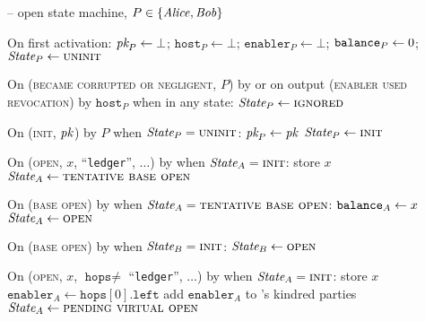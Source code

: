 \begin{center}
  \begin{systembox}{\fchan{} -- open state machine, $P \in \{\mathit{Alice}, \mathit{Bob}\}$}
    \begin{algorithmic}[1]
      \State On first activation: 
      \label{code:functionality:open:boot}
      \Indent
        \State $\textit{pk}_{P} \gets \bot$; $\texttt{host}_P \gets \bot$;
        $\texttt{enabler}_P \gets \bot$; $\texttt{balance}_{P} \gets 0$;
        \State $\itistate_P \gets \textsc{uninit}$
      \EndIndent
      \Statex

      \State On (\textsc{became corrupted or negligent}, $P$) by \adversary or
      on output (\textsc{enabler used revocation}) by $\texttt{host}_P$ when in
      any state:
      \label{code:functionality:open:when-ignored}
      \Indent
        \State $\itistate_P \gets \textsc{ignored}$
      \EndIndent
      \Statex

      \State On (\textsc{init}, $\textit{pk}_{}$) by $P$ when
      $\itistate_P = \textsc{uninit}$:
      \Indent
        \State $\textit{pk}_{P} \gets \textit{pk}_{}$
        \State $\itistate_P \gets \textsc{init}$
      \EndIndent
      \Statex

      \State On (\textsc{open}, $x$, ``\texttt{ledger}'', $\dots$) by \alice
      when $\itistate_A = \textsc{init}$:
      \Indent
        \State store $x$
        \label{code:functionality:open:store}
        \State $\itistate_A \gets \textsc{tentative base open}$
      \EndIndent
      \Statex

      \State On (\textsc{base open}) by \adversary when $\itistate_A =
      \textsc{tentative base open}$:
      \Indent
        \State $\texttt{balance}_{A} \gets x$
        \label{code:functionality:open:base-balance}
        \State $\itistate_A \gets \textsc{open}$
      \EndIndent
      \Statex

      \State On (\textsc{base open}) by \adversary when $\itistate_B =
      \textsc{init}$:
      \label{code:functionality:open:when-open-bob}
      \Indent
        \State $\itistate_B \gets \textsc{open}$
      \EndIndent
      \Statex

      \State On (\textsc{open}, $x$, $\texttt{hops} \neq$ ``\texttt{ledger}'',
      $\dots$) by \alice when $\itistate_A = \textsc{init}$:
      \Indent
        \State store $x$
        \State $\texttt{enabler}_A \gets \texttt{hops}[0].\texttt{left}$
        \State add $\texttt{enabler}_A$ to \alice's kindred parties
        \State $\itistate_A \gets \textsc{pending virtual open}$
      \EndIndent
      \Statex


\end{algorithmic}
\end{systembox}
\end{center}
